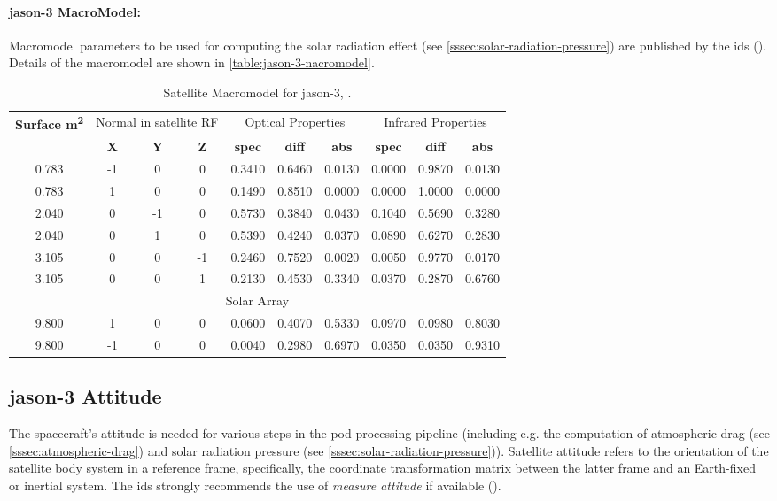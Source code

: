 \paragraph{\gls{jason}-3 MacroModel:}
Macromodel parameters to be used for computing 
the solar radiation effect (see \autoref{sssec:solar-radiation-pressure}) are published by the \gls{ids} 
(\cite{Cerri2022}). Details of the macromodel are shown in \autoref{table:jason-3-nacromodel}.
\begin{table}[h!]
    \centering
    \begin{tabular}{cccccccccc}
        \toprule
        \textbf{Surface \si{\meter\tothe{2}}} & 
            \multicolumn{3}{c}{Normal in satellite RF} &
            \multicolumn{3}{c}{Optical Properties} &
            \multicolumn{3}{c}{Infrared Properties} \\
         & 
         \textbf{X} & \textbf{Y} & \textbf{Z} &
         \textbf{spec} & \textbf{diff} & \textbf{abs} &
         \textbf{spec} & \textbf{diff} & \textbf{abs} \\
        \hline
        0.783& -1&   0&  0& 0.3410& 0.6460& 0.0130& 0.0000& 0.9870& 0.0130 \\
        0.783&  1 &  0&  0& 0.1490& 0.8510& 0.0000& 0.0000& 1.0000& 0.0000 \\
        2.040&  0 & -1&  0& 0.5730& 0.3840& 0.0430& 0.1040& 0.5690& 0.3280 \\
        2.040&  0 &  1&  0& 0.5390& 0.4240& 0.0370& 0.0890& 0.6270& 0.2830 \\
        3.105&  0 &  0& -1& 0.2460& 0.7520& 0.0020& 0.0050& 0.9770& 0.0170 \\
        3.105&  0 &  0&  1& 0.2130& 0.4530& 0.3340& 0.0370& 0.2870& 0.6760 \\
        \multicolumn{10}{c}{Solar Array} \\
        9.800&  1& 0& 0& 0.0600& 0.4070& 0.5330& 0.0970& 0.0980& 0.8030 \\
        9.800& -1& 0& 0& 0.0040& 0.2980& 0.6970& 0.0350& 0.0350& 0.9310 \\
       \bottomrule
    \end{tabular}
    \caption{Satellite Macromodel for \gls{jason}-3, \cite{Cerri2022}.}
    \label{table:jason-3-nacromodel}
\end{table}

\subsection{\gls{jason}-3 Attitude}\label{ssec:jason3-attitude}
The spacecraft's attitude is needed for various steps in the \gls{pod} processing 
pipeline (including e.g. the computation of atmospheric drag (see 
\autoref{sssec:atmospheric-drag}) and solar radiation pressure (see 
\autoref{sssec:solar-radiation-pressure})). Satellite attitude refers to the 
orientation of the satellite body system in a reference frame, specifically, the 
coordinate transformation matrix between the latter frame and an Earth-fixed 
or inertial system. The \gls{ids} strongly recommends the use of \emph{measure attitude} 
if available (\cite{IdsRecommendationItrf2020}). 


